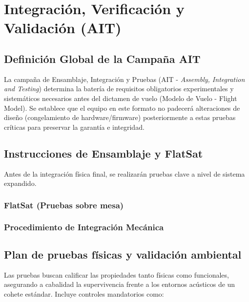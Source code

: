 \chapter{Integración, Verificación y Validación (AIT)}

\section{Definición Global de la Campaña AIT}
La campaña de Ensamblaje, Integración y Pruebas (AIT - \textit{Assembly, Integration and Testing}) determina la batería de requisitos obligatorios experimentales y sistemáticos necesarios antes del dictamen de vuelo (Modelo de Vuelo - Flight Model). Se establece que el equipo en este formato no padecerá alteraciones de diseño (congelamiento de hardware/firmware) posteriormente a estas pruebas críticas para preservar la garantía e integridad. 

\section{Instrucciones de Ensamblaje y FlatSat}
Antes de la integración física final, se realizarán pruebas clave a nivel de sistema expandido.

\subsection{FlatSat (Pruebas sobre mesa)}

\subsection{Procedimiento de Integración Mecánica}

\section{Plan de pruebas físicas y validación ambiental}
Las pruebas buscan calificar las propiedades tanto físicas como funcionales, asegurando a cabalidad la supervivencia frente a los entornos acústicos de un cohete estándar. Incluye controles mandatorios como:

